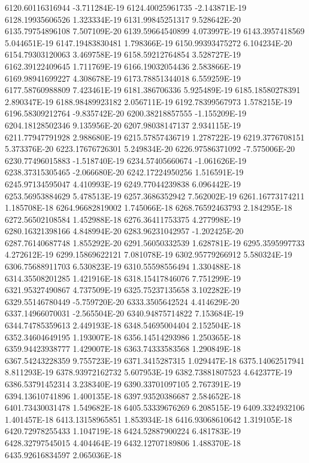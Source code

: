 6120.60116316944  -3.711284E-19
6124.40025961735  -2.143871E-19
6128.19935606526  1.323334E-19
6131.99845251317  9.528642E-20
6135.79754896108  7.507109E-20
6139.59664540899  4.073997E-19
6143.3957418569  5.044651E-19
6147.19483830481  1.798366E-19
6150.99393475272  6.104234E-20
6154.79303120063  3.469758E-19
6158.59212764854  3.528727E-19
6162.39122409645  1.711769E-19
6166.19032054436  2.583866E-19
6169.98941699227  4.308678E-19
6173.78851344018  6.559259E-19
6177.58760988809  7.423461E-19
6181.386706336  5.925489E-19
6185.18580278391  2.890347E-19
6188.98489923182  2.056711E-19
6192.78399567973  1.578215E-19
6196.58309212764  -9.835742E-20
6200.38218857555  -1.155209E-19
6204.18128502346  9.135956E-20
6207.98038147137  2.934115E-19
6211.77947791928  2.988680E-19
6215.57857436719  1.278722E-19
6219.3776708151  5.373376E-20
6223.17676726301  5.249834E-20
6226.97586371092  -7.575006E-20
6230.77496015883  -1.518740E-19
6234.57405660674  -1.061626E-19
6238.37315305465  -2.066680E-20
6242.17224950256  1.516591E-19
6245.97134595047  4.410993E-19
6249.77044239838  6.096442E-19
6253.56953884629  5.478513E-19
6257.3686352942  7.562002E-19
6261.16773174211  1.185708E-18
6264.96682819002  1.745066E-18
6268.76592463793  2.184295E-18
6272.56502108584  1.452988E-18
6276.36411753375  4.277998E-19
6280.16321398166  4.848994E-20
6283.96231042957  -1.202425E-20
6287.76140687748  1.855292E-20
6291.56050332539  1.628781E-19
6295.3595997733  4.272612E-19
6299.15869622121  7.081078E-19
6302.95779266912  5.580324E-19
6306.75688911703  6.530823E-19
6310.55598556494  1.330488E-18
6314.35508201285  1.421916E-18
6318.15417846076  7.751299E-19
6321.95327490867  4.737509E-19
6325.75237135658  3.102282E-19
6329.55146780449  -5.759720E-20
6333.3505642524  4.414629E-20
6337.14966070031  -2.565504E-20
6340.94875714822  7.153684E-19
6344.74785359613  2.449193E-18
6348.54695004404  2.152504E-18
6352.34604649195  1.193007E-18
6356.14514293986  1.250365E-18
6359.94423938777  1.429007E-18
6363.74333583568  1.290849E-18
6367.54243228359  9.755723E-19
6371.3415287315  1.029447E-18
6375.14062517941  8.811293E-19
6378.93972162732  5.607953E-19
6382.73881807523  4.642377E-19
6386.53791452314  3.238340E-19
6390.33701097105  2.767391E-19
6394.13610741896  1.400135E-18
6397.93520386687  2.584652E-18
6401.73430031478  1.549682E-18
6405.53339676269  6.208515E-19
6409.3324932106  1.401457E-18
6413.13158965851  1.853934E-18
6416.93068610642  1.319105E-18
6420.72978255433  1.104719E-18
6424.52887900224  6.481783E-19
6428.32797545015  4.404464E-19
6432.12707189806  1.488370E-18
6435.92616834597  2.065036E-18
